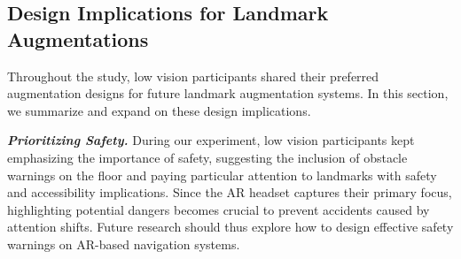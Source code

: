 

\subsection{Design Implications for Landmark Augmentations}
Throughout the study, low vision participants shared their preferred augmentation designs for future landmark augmentation systems. In this section, we summarize and expand on these design implications.

\textbf{\textit{Prioritizing Safety.}} During our experiment, low vision participants kept emphasizing the importance of safety, suggesting the inclusion of obstacle warnings on the floor and paying particular attention to landmarks with safety and accessibility implications. Since the AR headset captures their primary focus, highlighting potential dangers becomes crucial to prevent accidents caused by attention shifts. Future research should thus explore how to design effective safety warnings on AR-based navigation systems. 


